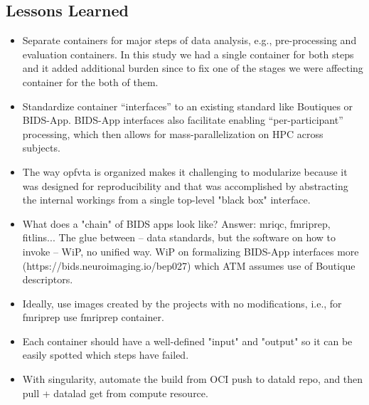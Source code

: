 \subsection{Lessons Learned}

\begin{itemize}
    \item
      Separate containers for major steps of data analysis, e.g., pre-processing and evaluation containers.
      In this study we had a single container for both steps and it added additional burden since to fix one of the stages we were affecting container for the both of them. 
    \item
      Standardize container ``interfaces'' to an existing standard like Boutiques or BIDS-App.
      BIDS-App interfaces also facilitate enabling ``per-participant'' processing, which then allows for mass-parallelization on HPC across subjects.
    \item
      The way opfvta is organized makes it challenging to modularize because it was designed for reproducibility and that was accomplished by abstracting the internal workings from a single top-level "black box" interface.
      \item What does a "chain" of BIDS apps look like?  Answer: mriqc, fmriprep, fitlins... The glue between -- data standards, but the software on how to invoke -- WiP, no unified way. WiP on formalizing BIDS-App interfaces more (https://bids.neuroimaging.io/bep027) which ATM assumes use of Boutique descriptors.
      \item Ideally, use images created by the projects with no modifications, i.e., for fmriprep use fmriprep container.
      \item Each container should have a well-defined "input" and "output" so it can be easily spotted which steps have failed.
  \item With singularity, automate the build from OCI push to datald repo, and then pull + datalad get from compute resource.
\end{itemize}



%
%
%

